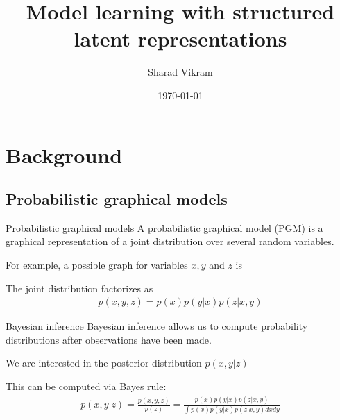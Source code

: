 \documentclass[10pt, compress]{beamer}
\title{Model learning with structured latent representations}
\subtitle{}
\date{\today}
\author{Sharad Vikram}
\institute{UCSD}
\begin{document}
\begin{frame}
\titlepage
\end{frame}

\section{Background}

\subsection{Probabilistic graphical models}






\begin{frame}{Probabilistic graphical models}
  A probabilistic graphical model (PGM)
  is a graphical representation of a joint distribution
  over several random variables.
  \pause

  For example, a possible graph for variables $x, y$ and $z$ is
  \begin{center}
    
  \end{center}
  \pause
  The joint distribution factorizes as
  \begin{align*}
    p(x, y, z) = p(x)p(y | x)p(z | x, y)
  \end{align*}
\end{frame}

\begin{frame}{Bayesian inference}
  Bayesian inference allows us to
  compute probability distributions
  after observations have been made.

  \pause

  \begin{center}
    
  \end{center}
  \pause
  We are interested in the posterior distribution $p(x, y | z)$

  \pause
  This can be computed via Bayes rule:
  \begin{align*}
    p(x, y | z) = \frac{p(x, y, z)}{p(z)} = \frac{p(x)p(y | x)p(z | x, y)}{\int p(x)p(y | x)p(z | x, y)dx dy}
  \end{align*}
\end{frame}
\end{document}
